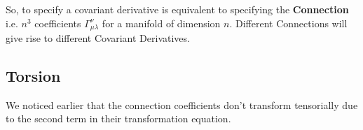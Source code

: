 \documentclass[11pt]{article}
\begin{document}
\begin{bluebox}
  So, to specify a covariant derivative is equivalent to specifying the \textbf{Connection} i.e. $n^3$ coefficients $\Gamma_{\mu \lambda}^{\nu}$ for a manifold of dimension $n$. Different Connections will give rise to different Covariant Derivatives. 
\end{bluebox}




\vskip 1cm
\subsection{Torsion}
We noticed earlier that the connection coefficients don't transform tensorially due to the second term in their transformation equation.  
\end{document}
